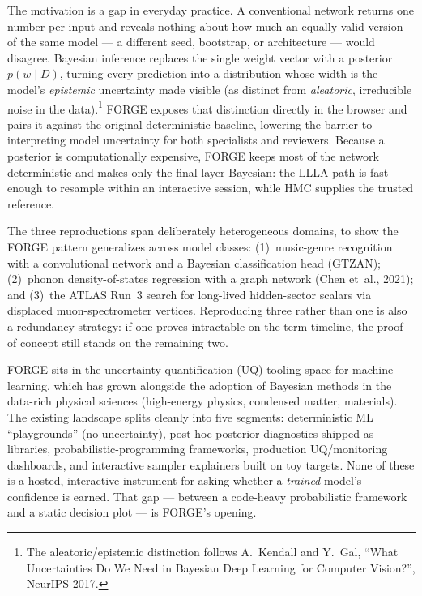 The motivation is a gap in everyday practice. A conventional network returns one number per input and reveals nothing about how much an equally valid version of the same model --- a different seed, bootstrap, or architecture --- would disagree. Bayesian inference replaces the single weight vector with a posterior $p(w \mid D)$, turning every prediction into a distribution whose width is the model's \emph{epistemic} uncertainty made visible (as distinct from \emph{aleatoric}, irreducible noise in the data).\footnote{The aleatoric/epistemic distinction follows A.\ Kendall and Y.\ Gal, ``What Uncertainties Do We Need in Bayesian Deep Learning for Computer Vision?'', NeurIPS 2017.} FORGE exposes that distinction directly in the browser and pairs it against the original deterministic baseline, lowering the barrier to interpreting model uncertainty for both specialists and reviewers. Because a posterior is computationally expensive, FORGE keeps most of the network deterministic and makes only the final layer Bayesian: the LLLA path is fast enough to resample within an interactive session, while HMC supplies the trusted reference.

The three reproductions span deliberately heterogeneous domains, to show the FORGE pattern generalizes across model classes: (1)~music-genre recognition with a convolutional network and a Bayesian classification head (GTZAN); (2)~phonon density-of-states regression with a graph network (Chen et~al., 2021); and (3)~the ATLAS Run~3 search for long-lived hidden-sector scalars via displaced muon-spectrometer vertices. Reproducing three rather than one is also a redundancy strategy: if one proves intractable on the term timeline, the proof of concept still stands on the remaining two.

\preparedby

FORGE sits in the uncertainty-quantification (UQ) tooling space for machine learning, which has grown alongside the adoption of Bayesian methods in the data-rich physical sciences (high-energy physics, condensed matter, materials). The existing landscape splits cleanly into five segments: deterministic ML ``playgrounds'' (no uncertainty), post-hoc posterior diagnostics shipped as libraries, probabilistic-programming frameworks, production UQ/monitoring dashboards, and interactive sampler explainers built on toy targets. None of these is a hosted, interactive instrument for asking whether a \emph{trained} model's confidence is earned. That gap --- between a code-heavy probabilistic framework and a static decision plot --- is FORGE's opening.


